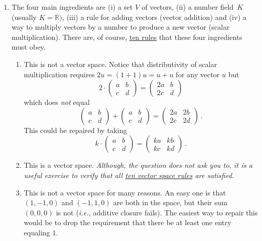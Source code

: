 \begin{enumerate}
\item The four main ingredients are
(i) a set $V$ of vectors, (ii) a number field~$K$ (usually $K={\mathbb R})$, (iii) a rule for adding vectors (vector addition) and (iv) a way to multiply vectors by a number to produce a new vector (scalar multiplication). 
There are, of course, \hyperref[vectorspace]{ten rules} that these four ingredients must obey.

\begin{enumerate}
\item This is not a vector space. Notice that distributivity of scalar multiplication requires
$2 u = (1+1) u = u + u$ for any vector $u$ but
\[
2\cdot \begin{pmatrix} a& b\\ c& d\end{pmatrix} =  \begin{pmatrix} 2a& b\\ 2c& d\end{pmatrix}
\]
which does {\itshape not} equal
\[
\begin{pmatrix} a& b\\ c& d\end{pmatrix}+\begin{pmatrix} a& b\\ c& d\end{pmatrix}=
\begin{pmatrix} 2a& 2b\\ 2c& 2d\end{pmatrix}\, .
\] 
This could be repaired by taking \[ k\cdot \begin{pmatrix} a& b\\ c& d\end{pmatrix}=
\begin{pmatrix} ka& kb\\ kc& kd\end{pmatrix}\, .\]
\item This is a vector space. {\itshape Although, the question does not ask you to, it is a useful exercise
to verify that all \hyperref[vectorspace]{ten vector space rules} are satisfied.}
\item This is not a vector space for many reasons. An easy one is that $(1,-1,0)$ and $(-1,1,0)$
are both in the space, but their sum $(0,0,0)$ is not ({\itshape i.e.}, additive closure fails).
The easiest way to repair this would be to drop the requirement that there be at least one entry equaling 1.
 
 \end{enumerate}
 

\end{enumerate}

